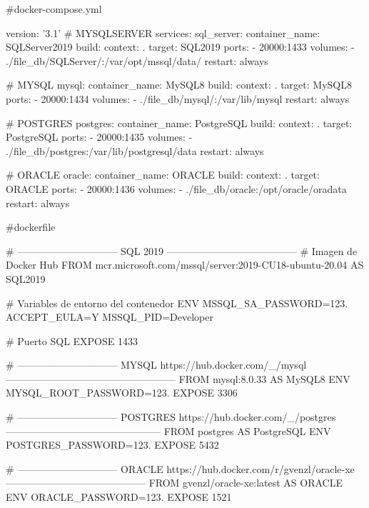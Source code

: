 #docker-compose.yml

version: '3.1'
#     MYSQLSERVER
services:
  sql_server:
    container_name: SQLServer2019
    build: 
      context: .
      target: SQL2019
    ports:
      - 20000:1433
    volumes:
      - ./file_db/SQLServer/:/var/opt/mssql/data/
    restart: always

#     MYSQL
  mysql:
    container_name: MySQL8
    build:
      context: .
      target: MySQL8
    ports:
      - 20000:1434
    volumes:
      - ./file_db/mysql/:/var/lib/mysql
    restart: always

#     POSTGRES
  postgres:
    container_name: PostgreSQL
    build: 
      context: .
      target: PostgreSQL
    ports:
      - 20000:1435
    volumes:
      - ./file_db/postgres:/var/lib/postgresql/data
    restart: always
    
#     ORACLE 
  oracle:
    container_name: ORACLE
    build: 
      context: .
      target: ORACLE
    ports:
      - 20000:1436
    volumes:
      - ./file_db/oracle:/opt/oracle/oradata
    restart: always
    
    
    #dockerfile
    
    # ------------------------------ SQL 2019 ---------------------------------------
# Imagen de Docker Hub
FROM mcr.microsoft.com/mssql/server:2019-CU18-ubuntu-20.04 AS SQL2019

# Variables de entorno del contenedor
ENV MSSQL_SA_PASSWORD=123. ACCEPT_EULA=Y MSSQL_PID=Developer 

# Puerto SQL
EXPOSE 1433

# ------------------------------ MYSQL https://hub.docker.com/_/mysql ---------------------------------------------------
FROM mysql:8.0.33 AS MySQL8
ENV MYSQL_ROOT_PASSWORD=123.
EXPOSE 3306

# ------------------------------ POSTGRES https://hub.docker.com/_/postgres -----------------------------------------------
FROM postgres AS PostgreSQL
ENV POSTGRES_PASSWORD=123.
EXPOSE 5432

# ------------------------------ ORACLE https://hub.docker.com/r/gvenzl/oracle-xe ------------------------------------------
FROM gvenzl/oracle-xe:latest AS ORACLE
ENV ORACLE_PASSWORD=123.
EXPOSE 1521